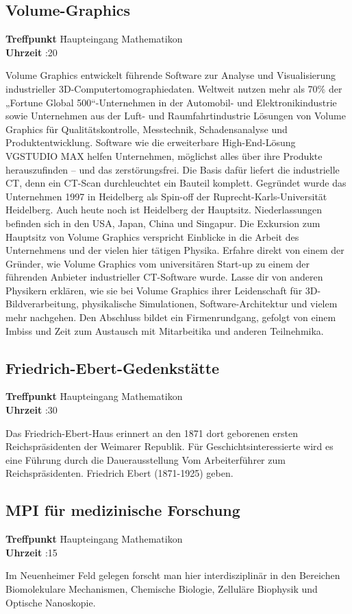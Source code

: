 \subsection*{Volume-Graphics}
\begin{tabbing}
\textbf{Treffpunkt} \quad \quad \quad \= Haupteingang Mathematikon\\
\textbf{Uhrzeit} :20
\end{tabbing}
\hochruecken
Volume Graphics entwickelt führende Software zur Analyse und Visualisierung industrieller 3D-Computertomographiedaten. Weltweit nutzen mehr als 70\% der „Fortune Global 500“-Unternehmen in der Automobil- und Elektronikindustrie sowie Unternehmen aus der Luft- und Raumfahrtindustrie Lösungen von Volume Graphics für Qualitätskontrolle, Messtechnik, Schadensanalyse und Produktentwicklung. Software wie die erweiterbare High-End-Lösung VGSTUDIO MAX helfen Unternehmen, möglichst alles über ihre Produkte herauszufinden – und das zerstörungsfrei. Die Basis dafür liefert die industrielle CT, denn ein CT-Scan durchleuchtet ein Bauteil komplett. Gegründet wurde das Unternehmen 1997 in Heidelberg als Spin-off der Ruprecht-Karls-Universität Heidelberg. Auch heute noch ist Heidelberg der Hauptsitz. Niederlassungen befinden sich in den USA, Japan, China und Singapur. Die Exkursion zum Hauptsitz von Volume Graphics verspricht Einblicke in die Arbeit des Unternehmens und der vielen hier tätigen Physika. Erfahre direkt von einem der Gründer, wie Volume Graphics vom universitären Start-up zu einem der führenden Anbieter industrieller CT-Software wurde. Lasse dir von anderen Physikern erklären, wie sie bei Volume Graphics ihrer Leidenschaft für 3D-Bildverarbeitung, physikalische Simulationen, Software-Architektur und vielem mehr nachgehen. Den Abschluss bildet ein Firmenrundgang, gefolgt von einem Imbiss und Zeit zum Austausch mit Mitarbeitika und anderen Teilnehmika. 

\hochruecken
\subsection*{Friedrich-Ebert-Gedenkstätte}
\begin{tabbing}
\textbf{Treffpunkt} \quad \quad \quad \= Haupteingang Mathematikon\\
\textbf{Uhrzeit} :30
\end{tabbing}
\hochruecken
Das Friedrich-Ebert-Haus erinnert an den 1871 dort geborenen ersten Reichspräsidenten der Weimarer Republik. Für Geschichtsinteressierte wird es eine Führung durch die Dauerausstellung \glqq Vom Arbeiterführer zum Reichspräsidenten. Friedrich Ebert (1871-1925)\grqq{} geben.

\hochruecken
\subsection*{MPI für medizinische Forschung}
\begin{tabbing}
\textbf{Treffpunkt} \quad \quad \quad \= Haupteingang Mathematikon\\
\textbf{Uhrzeit} :15
\end{tabbing}
\hochruecken
Im Neuenheimer Feld gelegen forscht man hier interdisziplinär in den Bereichen Biomolekulare Mechanismen, Chemische Biologie, Zelluläre Biophysik und Optische Nanoskopie. 